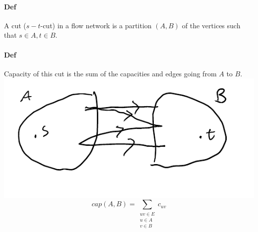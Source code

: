 \documentclass[12 pt]{article}
\begin{document}
        \paragraph{Def} A cut ($s-t$-cut) in a flow network is a
        partition $(A,B)$ of the vertices such that $s \in A, t\in B$.
        \paragraph{Def} Capacity of this cut is the sum of the
        capacities and edges going from $A$ to $B$.
        \\ \includegraphics[width=.7\textwidth]{i19.pdf}
        $$cap(A,B)=\sum_{\substack{uv\in E \\ u \in A \\ v \in B}} c_{uv}$$
\end{document}
